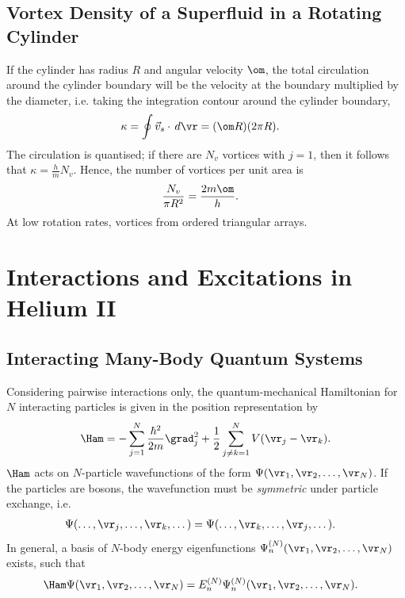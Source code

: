 \documentclass[a4paper, 11pt, normalem]{report}
\begin{document}
\section{Vortex Density of a Superfluid in a Rotating Cylinder}
If the cylinder has radius $R$ and angular velocity $\om$, the total circulation around the cylinder boundary will be the velocity at the boundary multiplied by the diameter, i.e. taking the integration contour around the cylinder boundary,
\begin{align}
    \kappa &= \oint \vec{v}_s\cdot\,d\vr = (\om R)(2\pi R).
\end{align}
The circulation is quantised; if there are $N_v$ vortices with $j=1$, then it follows that $\kappa=\frac{h}{m}N_v$.
Hence, the number of vortices per unit area is
\begin{align}
    \frac{N_v}{\pi R^2} &= \frac{2m\om}{h}.
\end{align}
At low rotation rates, vortices from ordered triangular arrays.

\chapter{Interactions and Excitations in Helium II}
\section{Interacting Many-Body Quantum Systems}
Considering pairwise interactions only, the quantum-mechanical Hamiltonian for $N$ interacting particles is given in the position representation by
\begin{align}
    \Ham = -\sum_{j=1}^N \frac{\hbar^2}{2m}\grad_j^2 + \frac12\sum_{j\neq k=1}^N V(\vr_j-\vr_k).
\end{align}
$\Ham$ acts on $N$-particle wavefunctions of the form $\Psi(\vr_1,\vr_2,\dots,\vr_N)$.
If the particles are bosons, the wavefunction must be \emph{symmetric} under particle exchange, i.e.
\begin{align}
    \Psi(\dots,\vr_j,\dots,\vr_k,\dots) &= \Psi(\dots,\vr_k,\dots,\vr_j,\dots).
\end{align}
In general, a basis of $N$-body energy eigenfunctions $\Psi_n^{(N)}(\vr_1,\vr_2,\dots,\vr_N)$ exists, such that
\begin{align}
    \Ham\Psi(\vr_1,\vr_2,\dots,\vr_N) &= E_n^{(N)}\Psi_n^{(N)}(\vr_1,\vr_2,\dots,\vr_N).
\end{align}
\end{document}
